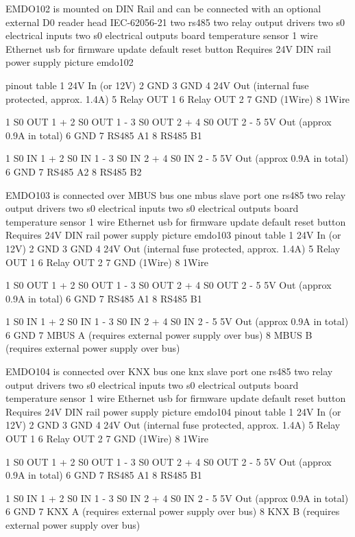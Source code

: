\documentclass[11pt,fleqn]{book} %
\numberwithin{equation}{section} %
\numberwithin{figure}{section} %
\numberwithin{table}{section} %
\begin{document}
EMDO102 is mounted on DIN Rail and can be connected with an optional external D0 reader head IEC-62056-21
two rs485
two relay output drivers
two s0 electrical inputs
two s0 electrical outputs
board temperature sensor
1 wire
Ethernet 
usb for firmware update
default reset button
Requires 24V DIN rail power supply
picture emdo102

pinout table
1 24V In (or 12V)
2 GND
3 GND
4 24V Out (internal fuse protected, approx. 1.4A)
5 Relay OUT 1
6 Relay OUT 2
7 GND (1Wire)
8 1Wire

1 S0 OUT 1 +
2 S0 OUT 1 -
3 S0 OUT 2 +
4 S0 OUT 2 -
5 5V Out (approx 0.9A in total)
6 GND
7 RS485 A1
8 RS485 B1

1 S0 IN 1 +
2 S0 IN 1 -
3 S0 IN 2 +
4 S0 IN 2 -
5 5V Out (approx 0.9A in total)
6 GND
7 RS485 A2
8 RS485 B2



EMDO103 is connected over MBUS bus
one mbus slave port
one rs485
two relay output drivers
two s0 electrical inputs
two s0 electrical outputs
board temperature sensor
1 wire
Ethernet 
usb for firmware update
default reset button
Requires 24V DIN rail power supply
picture emdo103
pinout table
1 24V In (or 12V)
2 GND
3 GND
4 24V Out (internal fuse protected, approx. 1.4A)
5 Relay OUT 1
6 Relay OUT 2
7 GND (1Wire)
8 1Wire

1 S0 OUT 1 +
2 S0 OUT 1 -
3 S0 OUT 2 +
4 S0 OUT 2 -
5 5V Out (approx 0.9A in total)
6 GND
7 RS485 A1
8 RS485 B1

1 S0 IN 1 +
2 S0 IN 1 -
3 S0 IN 2 +
4 S0 IN 2 -
5 5V Out (approx 0.9A in total)
6 GND
7 MBUS A (requires external power supply over bus)
8 MBUS B (requires external power supply over bus)



EMDO104 is connected over KNX bus
one knx slave port
one rs485
two relay output drivers
two s0 electrical inputs
two s0 electrical outputs
board temperature sensor
1 wire
Ethernet 
usb for firmware update
default reset button
Requires 24V DIN rail power supply
picture emdo104
pinout table
1 24V In (or 12V)
2 GND
3 GND
4 24V Out (internal fuse protected, approx. 1.4A)
5 Relay OUT 1
6 Relay OUT 2
7 GND (1Wire)
8 1Wire

1 S0 OUT 1 +
2 S0 OUT 1 -
3 S0 OUT 2 +
4 S0 OUT 2 -
5 5V Out (approx 0.9A in total)
6 GND
7 RS485 A1
8 RS485 B1

1 S0 IN 1 +
2 S0 IN 1 -
3 S0 IN 2 +
4 S0 IN 2 -
5 5V Out (approx 0.9A in total)
6 GND
7 KNX A (requires external power supply over bus)
8 KNX B (requires external power supply over bus)
\end{document}
